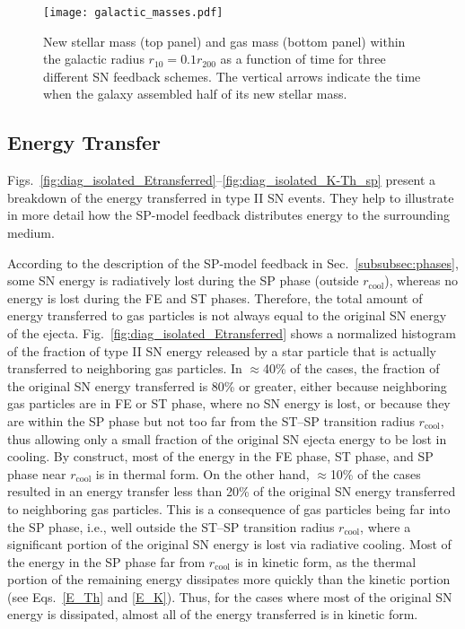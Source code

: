 \documentclass[iop]{emulateapj}
\begin{document}
\begin{figure}
\texttt{[image: galactic\_masses.pdf]}
\caption{New stellar mass (top panel) and gas mass (bottom panel) within the galactic radius $r_{10}=0.1 r_{200}$ as a function of time for three different SN feedback schemes. The vertical arrows indicate the time when the galaxy assembled half of its new stellar mass.}
\label{fig:masses_isolated}
\end{figure}

\subsection{Energy Transfer}\label{subsec:res_Etransfer}
Figs.~\ref{fig:diag_isolated_Etransferred}--\ref{fig:diag_isolated_K-Th_sp} present a breakdown of the energy transferred in type II SN events. They help to illustrate in more detail how the SP-model feedback distributes energy to the surrounding medium.

According to the description of the SP-model feedback in Sec.~\ref{subsubsec:phases}, some SN energy is radiatively lost during the SP phase (outside $r_{\mathrm{cool}}$), whereas no energy is lost during the FE and ST phases. Therefore, the total amount of energy transferred to gas particles is not always equal to the original SN energy of the ejecta. Fig.~\ref{fig:diag_isolated_Etransferred} shows a normalized histogram of the fraction of type II SN energy released by a star particle that is actually transferred to neighboring gas particles. In $\approx$40\% of the cases, the fraction of the original SN energy transferred is 80\% or greater, either because neighboring gas particles are in FE or ST phase, where no SN energy is lost, or because they are within the SP phase but not too far from the ST--SP transition radius $r_{\mathrm{cool}}$, thus allowing only a small fraction of the original SN ejecta energy to be lost in cooling. By construct, most of the energy in the FE phase, ST phase, and SP phase near $r_{\mathrm{cool}}$ is in thermal form. On the other hand, $\approx$10\% of the cases resulted in an energy transfer less than 20\% of the original SN energy transferred to neighboring gas particles. This is a consequence of gas particles being far into the SP phase, i.e., well outside the ST--SP transition radius $r_{\mathrm{cool}}$, where a significant portion of the original SN energy is lost via radiative cooling. Most of the energy in the SP phase far from $r_{\mathrm{cool}}$ is in kinetic form, as the thermal portion of the remaining energy dissipates more quickly than the kinetic portion (see Eqs.~\ref{E_Th} and \ref{E_K}). Thus, for the cases where most of the original SN energy is dissipated, almost all of the energy transferred is in kinetic form.
\end{document}
